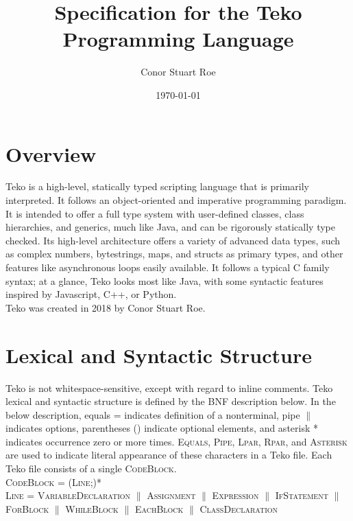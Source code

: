 \documentclass{article}
\title{Specification for the Teko Programming Language}
\author{Conor Stuart Roe}
\date{\today}
\begin{document}
\thispagestyle{empty}
\maketitle

\section{Overview}

Teko is a high-level, statically typed scripting language that is primarily interpreted. It follows an object-oriented and imperative programming paradigm. It is intended to offer a full type system with user-defined classes, class hierarchies, and generics, much like Java, and can be rigorously statically type checked. Its high-level architecture offers a variety of advanced data types, such as complex numbers, bytestrings, maps, and structs as primary types, and other features like asynchronous loops easily available. It follows a typical C family syntax; at a glance, Teko looks most like Java, with some syntactic features inspired by Javascript, C++, or Python. \\

Teko was created in 2018 by Conor Stuart Roe.

\section{Lexical and Syntactic Structure}

Teko is not whitespace-sensitive, except with regard to inline comments. Teko lexical and syntactic structure is defined by the BNF description below. In the below description, equals = indicates definition of a nonterminal, pipe $\|$ indicates options, parentheses () indicate optional elements, and asterisk * indicates occurrence zero or more times. \textsc{Equals}, \textsc{Pipe}, \textsc{Lpar}, \textsc{Rpar}, and \textsc{Asterisk} are used to indicate literal appearance of these characters in a Teko file. Each Teko file consists of a single \textsc{CodeBlock}. \\

\textsc{CodeBlock} = (\textsc{Line};)* \\

\textsc{Line} = \textsc{VariableDeclaration} $\|$ \textsc{Assignment} $\|$ \textsc{Expression} $\|$ \textsc{IfStatement} $\|$ \textsc{ForBlock} $\|$ \textsc{WhileBlock} $\|$ \textsc{EachBlock} $\|$ \textsc{ClassDeclaration} \\
\end{document}
